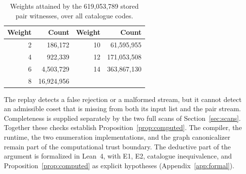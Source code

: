 \begin{table}[t]
\caption{Weights attained by the 619,053,789 stored pair witnesses, over all catalogue codes.}
\label{tab:witness}
\centering\small
\begin{tabular}{@{}rr@{\qquad}rr@{}}
\toprule
Weight & Count & Weight & Count\\
\midrule
2 & 186,172 & 10 & 61,595,955\\
4 & 922,339 & 12 & 171,053,508\\
6 & 4,503,729 & 14 & 363,867,130\\
8 & 16,924,956 & & \\
\bottomrule
\end{tabular}
\end{table}

The replay detects a false rejection or a malformed stream, but it cannot detect an admissible coset that is missing from both its input list and the pair stream. Completeness is supplied separately by the two full scans of Section~\ref{sec:scans}. Together these checks establish Proposition~\ref{prop:computed}. The compiler, the runtime, the two enumeration implementations, and the graph canonicalizer remain part of the computational trust boundary. The deductive part of the argument is formalized in Lean~4, with E1, E2, catalogue inequivalence, and Proposition~\ref{prop:computed} as explicit hypotheses (Appendix~\ref{app:formal}).
